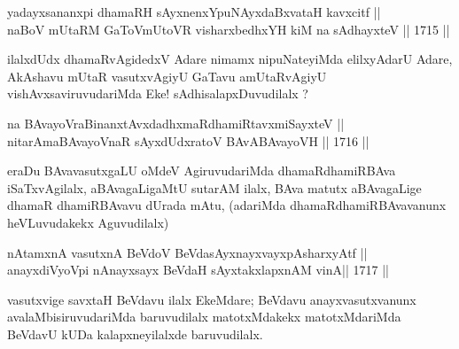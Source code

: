 
\begin{shl}
yadayxsananxpi dhamaRH sAyxnenxYpuNAyxdaBxvataH kavxcitf || \\
naBoV mUtaRM GaToV\s mUtoVR visharxbedhxYH kiM na sAdhayxteV ||  1715 ||  
\end{shl}

\begin{artha}
ilalxdUdx dhamaRvAgidedxV Adare nimamx nipuNateyiMda elilxyAdarU Adare,
AkAshavu mUtaR vasutxvAgiyU GaTavu amUtaRvAgiyU vishAvxsaviruvudariMda
Eke! sAdhisalapxDuvudilalx ?
\end{artha}


\begin{shl}
na BAvayoVraBinanxtAvxdadhxmaRdhamiRtavxmiSayxteV ||  \\
nitarAmaBAvayoVnaR sAyxdUdxratoV BAvABAvayoVH ||  1716 ||
\end{shl}

\begin{artha}
eraDu BAvavasutxgaLU oMdeV AgiruvudariMda dhamaRdhamiRBAva
iSaTxvAgilalx, aBAvagaLigaMtU sutarAM ilalx, BAva matutx aBAvagaLige
dhamaR dhamiRBAvavu dUrada mAtu, (adariMda dhamaRdhamiRBAvavanunx
heVLuvudakekx Aguvudilalx)
\end{artha}

\begin{shl}
nA\s \s tamxnA vasutxnA BeVdoV BeVdasAyxnayxvayxpAsharxyAtf || \\
anayxdiVyoV\s pi nAnayxsayx BeVdaH sAyxtakxlapxnAM vinA\footnotemark[1] ||  1717 ||  
\end{shl}

\begin{artha}
vasutxvige savxtaH BeVdavu ilalx EkeMdare; BeVdavu
anayxvasutxvanunx avalaMbisiruvudariMda baruvudilalx matotxMdakekx
matotxMdariMda BeVdavU kUDa kalapxneyilalxde baruvudilalx.
\end{artha}

